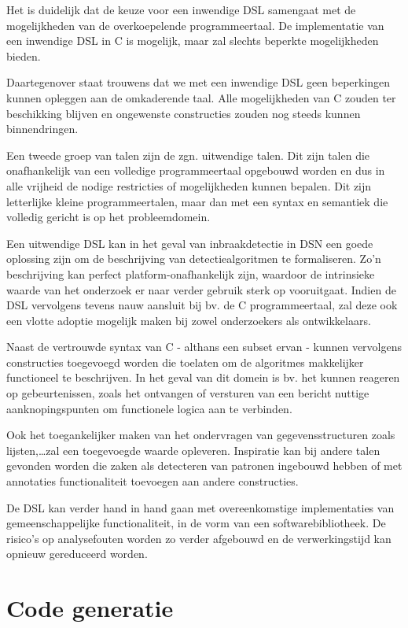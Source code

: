 Het is duidelijk dat de keuze voor een inwendige DSL samengaat met de
mogelijkheden van de overkoepelende programmeertaal. De implementatie van een
inwendige DSL in C is mogelijk, maar zal slechts beperkte mogelijkheden bieden.

Daartegenover staat trouwens dat we met een inwendige DSL geen beperkingen
kunnen opleggen aan de omkaderende taal. Alle mogelijkheden van C zouden ter
beschikking blijven en ongewenste constructies zouden nog steeds kunnen
binnendringen.

Een tweede groep van talen zijn de zgn. uitwendige talen. Dit zijn talen die
onafhankelijk van een volledige programmeertaal opgebouwd worden en dus in alle
vrijheid de nodige restricties of mogelijkheden kunnen bepalen. Dit zijn
letterlijke kleine programmeertalen, maar dan met een syntax en semantiek die
volledig gericht is op het probleemdomein.

Een uitwendige DSL kan in het geval van inbraakdetectie in DSN een goede
oplossing zijn om de beschrijving van detectiealgoritmen te formaliseren. Zo'n
beschrijving kan perfect platform-onafhankelijk zijn, waardoor de intrinsieke
waarde van het onderzoek er naar verder gebruik sterk op vooruitgaat. Indien de
DSL vervolgens tevens nauw aansluit bij bv. de C programmeertaal, zal deze ook
een vlotte adoptie mogelijk maken bij zowel onderzoekers als ontwikkelaars.

Naast de vertrouwde syntax van C - althans een subset ervan - kunnen vervolgens
constructies toegevoegd worden die toelaten om de algoritmes makkelijker
functioneel te beschrijven. In het geval van dit domein is bv. het kunnen
reageren op gebeurtenissen, zoals het ontvangen of versturen van een bericht
nuttige aanknopingspunten om functionele logica aan te verbinden.

Ook het toegankelijker maken van het ondervragen van gegevensstructuren zoals
lijsten,\dots zal een toegevoegde waarde opleveren. Inspiratie kan bij andere
talen gevonden worden die zaken als detecteren van patronen ingebouwd hebben of
met annotaties functionaliteit toevoegen aan andere constructies.

De DSL kan verder hand in hand gaan met overeenkomstige implementaties van
gemeenschappelijke functionaliteit, in de vorm van een softwarebibliotheek. De
risico's op analysefouten worden zo verder afgebouwd en de verwerkingstijd kan
opnieuw gereduceerd worden.

\section{Code generatie}
\label{section:solution-codegen}

